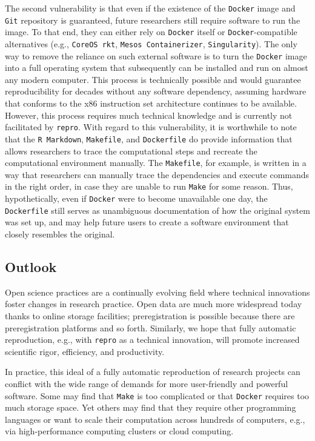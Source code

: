 \documentclass[psych,tutorial,accept,moreauthors,pdftex]{Definitions/mdpi}
\begin{document}
\begin{paracol}{2}
The second vulnerability is that even if the existence of the
\texttt{Docker} image and \texttt{Git} repository is guaranteed, future
researchers still require software to run the image. To that end, they
can either rely on \texttt{Docker} itself or \texttt{Docker}-compatible
alternatives (e.g., \texttt{CoreOS\ rkt}, \texttt{Mesos\ Containerizer},
\texttt{Singularity}). The only way to remove the reliance on such
external software is to turn the \texttt{Docker} image into a full
operating system that subsequently can be installed and run on almost
any modern computer. This process is technically possible and would
guarantee reproducibility for decades without any software dependency,
assuming hardware that conforms to the x86 instruction set architecture
continues to be available. However, this process requires much technical
knowledge and is currently not facilitated by \texttt{repro}. With
regard to this vulnerability, it is worthwhile to note that the
\texttt{R\ Markdown}, \texttt{Makefile}, and \texttt{Dockerfile} do
provide information that allows researchers to trace the computational
steps and recreate the computational environment manually. The
\texttt{Makefile}, for example, is written in a way that researchers can
manually trace the dependencies and execute commands in the right order,
in case they are unable to run \texttt{Make} for some reason. Thus,
hypothetically, even if \texttt{Docker} were to become unavailable one
day, the \texttt{Dockerfile} still serves as unambiguous documentation
of how the original system was set up, and may help future users to
create a software environment that closely resembles the original.

\subsection{Outlook}\label{outlook}

Open science practices are a continually evolving field where technical
innovations foster changes in research practice. Open data are much more
widespread today thanks to online storage facilities; preregistration is
possible because there are preregistration platforms and so forth.
Similarly, we hope that fully automatic reproduction, e.g., with
\texttt{repro} as a technical innovation, will promote increased
scientific rigor, efficiency, and productivity.

In practice, this ideal of a fully automatic reproduction of research
projects can conflict with the wide range of demands for more
user-friendly and powerful software. Some may find that \texttt{Make} is
too complicated or that \texttt{Docker} requires too much storage space.
Yet others may find that they require other programming languages or
want to scale their computation across hundreds of computers, e.g., via
high-performance computing clusters or cloud computing.


\end{paracol}
\end{document}
